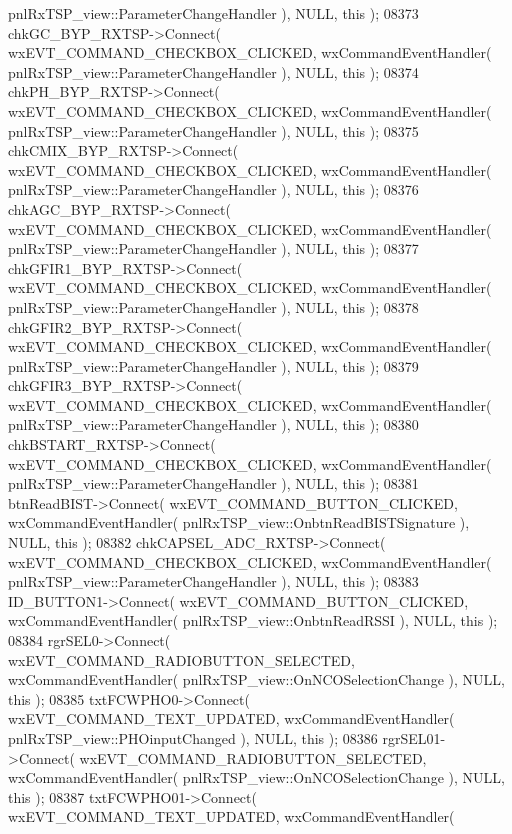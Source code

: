 \begin{DoxyCode}
      pnlRxTSP_view::ParameterChangeHandler ), NULL, \textcolor{keyword}{this} );
08373     chkGC_BYP_RXTSP->Connect( wxEVT\_COMMAND\_CHECKBOX\_CLICKED, wxCommandEventHandler( 
      pnlRxTSP_view::ParameterChangeHandler ), NULL, \textcolor{keyword}{this} );
08374     chkPH_BYP_RXTSP->Connect( wxEVT\_COMMAND\_CHECKBOX\_CLICKED, wxCommandEventHandler( 
      pnlRxTSP_view::ParameterChangeHandler ), NULL, \textcolor{keyword}{this} );
08375     chkCMIX_BYP_RXTSP->Connect( wxEVT\_COMMAND\_CHECKBOX\_CLICKED, wxCommandEventHandler( 
      pnlRxTSP_view::ParameterChangeHandler ), NULL, \textcolor{keyword}{this} );
08376     chkAGC_BYP_RXTSP->Connect( wxEVT\_COMMAND\_CHECKBOX\_CLICKED, wxCommandEventHandler( 
      pnlRxTSP_view::ParameterChangeHandler ), NULL, \textcolor{keyword}{this} );
08377     chkGFIR1_BYP_RXTSP->Connect( wxEVT\_COMMAND\_CHECKBOX\_CLICKED, wxCommandEventHandler( 
      pnlRxTSP_view::ParameterChangeHandler ), NULL, \textcolor{keyword}{this} );
08378     chkGFIR2_BYP_RXTSP->Connect( wxEVT\_COMMAND\_CHECKBOX\_CLICKED, wxCommandEventHandler( 
      pnlRxTSP_view::ParameterChangeHandler ), NULL, \textcolor{keyword}{this} );
08379     chkGFIR3_BYP_RXTSP->Connect( wxEVT\_COMMAND\_CHECKBOX\_CLICKED, wxCommandEventHandler( 
      pnlRxTSP_view::ParameterChangeHandler ), NULL, \textcolor{keyword}{this} );
08380     chkBSTART_RXTSP->Connect( wxEVT\_COMMAND\_CHECKBOX\_CLICKED, wxCommandEventHandler( 
      pnlRxTSP_view::ParameterChangeHandler ), NULL, \textcolor{keyword}{this} );
08381     btnReadBIST->Connect( wxEVT\_COMMAND\_BUTTON\_CLICKED, wxCommandEventHandler( 
      pnlRxTSP_view::OnbtnReadBISTSignature ), NULL, \textcolor{keyword}{this} );
08382     chkCAPSEL_ADC_RXTSP->Connect( wxEVT\_COMMAND\_CHECKBOX\_CLICKED, wxCommandEventHandler( 
      pnlRxTSP_view::ParameterChangeHandler ), NULL, \textcolor{keyword}{this} );
08383     ID_BUTTON1->Connect( wxEVT\_COMMAND\_BUTTON\_CLICKED, wxCommandEventHandler( 
      pnlRxTSP_view::OnbtnReadRSSI ), NULL, \textcolor{keyword}{this} );
08384     rgrSEL0->Connect( wxEVT\_COMMAND\_RADIOBUTTON\_SELECTED, wxCommandEventHandler( 
      pnlRxTSP_view::OnNCOSelectionChange ), NULL, \textcolor{keyword}{this} );
08385     txtFCWPHO0->Connect( wxEVT\_COMMAND\_TEXT\_UPDATED, wxCommandEventHandler( 
      pnlRxTSP_view::PHOinputChanged ), NULL, \textcolor{keyword}{this} );
08386     rgrSEL01->Connect( wxEVT\_COMMAND\_RADIOBUTTON\_SELECTED, wxCommandEventHandler( 
      pnlRxTSP_view::OnNCOSelectionChange ), NULL, \textcolor{keyword}{this} );
08387     txtFCWPHO01->Connect( wxEVT\_COMMAND\_TEXT\_UPDATED, wxCommandEventHandler( 

\end{DoxyCode}
